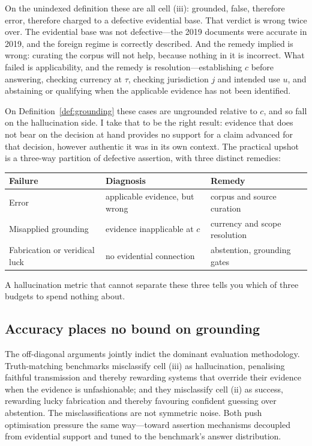 On the unindexed definition these are all cell (iii): grounded, false, therefore
error, therefore charged to a defective evidential base. That verdict is wrong
twice over. The evidential base was not defective---the 2019 documents were
accurate in 2019, and the foreign regime is correctly described. And the remedy
implied is wrong: curating the corpus will not help, because nothing in it is
incorrect. What failed is applicability, and the remedy is
resolution---establishing $c$ before answering, checking currency at $\tau$,
checking jurisdiction $j$ and intended use $u$, and abstaining or qualifying when
the applicable evidence has not been identified.

On Definition~\ref{def:grounding} these cases are ungrounded relative to $c$, and
so fall on the hallucination side. I take that to be the right result: evidence
that does not bear on the decision at hand provides no support for a claim
advanced for that decision, however authentic it was in its own context. The
practical upshot is a three-way partition of defective assertion, with three
distinct remedies:

\begin{center}
\begin{tabular}{@{}lll@{}}
\toprule
Failure & Diagnosis & Remedy \\
\midrule
Error & applicable evidence, but wrong & corpus and source curation \\
Misapplied grounding & evidence inapplicable at $c$ & currency and scope resolution \\
Fabrication or veridical luck & no evidential connection & abstention, grounding gates \\
\bottomrule
\end{tabular}
\end{center}

A hallucination metric that cannot separate these three tells you which of three
budgets to spend nothing about.

\subsection{Accuracy places no bound on grounding}
\label{sec:independence}

The off-diagonal arguments jointly indict the dominant evaluation methodology.
Truth-matching benchmarks misclassify cell (iii) as hallucination, penalising
faithful transmission and thereby rewarding systems that override their evidence
when the evidence is unfashionable; and they misclassify cell (ii) as success,
rewarding lucky fabrication and thereby favouring confident guessing over
abstention. The misclassifications are not symmetric noise. Both push
optimisation pressure the same way---toward assertion mechanisms decoupled from
evidential support and tuned to the benchmark's answer distribution.

